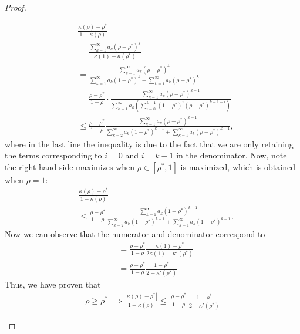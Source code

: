 \documentclass[twoside]{article}
\theoremstyle{definition}
\begin{document}
\begin{proof}
\begin{itemize}
\begin{align*}
&\frac{\kappa(\rho)-\rho^*}{1-\kappa(\rho)} \\
&= \frac{\sum_{k=1}^\infty a_k (\rho-\rho^*)^k}{\kappa(1)- \kappa(\rho^*)}\\
&= \frac{\sum_{k=1}^\infty a_k (\rho-\rho^*)^k}{\sum_{k=1}^\infty a_k (1-\rho^*)^k - \sum_{k=1}^\infty a_k (\rho-\rho^*)^k}  \\
&= \frac{\rho-\rho^*}{1-\rho}\cdot\frac{\sum_{k=1}^\infty a_k (\rho-\rho^*)^{k-1}}{\sum_{k=1}^\infty a_k (\sum_{i=0}^{k-1}(1-\rho^*)^i(\rho-\rho^*)^{k-1-i})}\\
&\le \frac{\rho-\rho^*}{1-\rho}\frac{\sum_{k=1}^\infty a_k (\rho-\rho^*)^{k-1}}{\sum_{k=2}^\infty a_k (1-\rho^*)^{k-1} + \sum_{k=1}^\infty a_k (\rho-\rho^*)^{k-1}},
\end{align*}
where in the last line the inequality is due to the fact that we are only retaining the terms corresponding to $i=0$ and $i=k-1$ in the denominator.
Now, note the right hand side maximizes when $\rho\in[\rho^*,1]$ is maximized, which is obtained when $\rho=1$:
\begin{align*}
&\frac{\kappa(\rho)-\rho^*}{1-\kappa(\rho)}\\
&\le \frac{\rho-\rho^*}{1-\rho}\frac{\sum_{k=1}^\infty a_k (1-\rho^*)^{k-1}}{\sum_{k=2}^\infty a_k (1-\rho^*)^{k-1} + \sum_{k=1}^\infty a_k (1-\rho^*)^{k-1}}.
\end{align*}
Now we can observe that the numerator and denominator correspond to 
\begin{align*}
    &=\frac{\rho-\rho^*}{1-\rho}\frac{\kappa(1)-\rho^*}{2\kappa(1)-\kappa'(\rho^*)}\\
&=\frac{\rho-\rho^*}{1-\rho}\frac{1-\rho^*}{2-\kappa'(\rho^*)}
\end{align*}
Thus, we have proven that 
\begin{align*}
\rho \ge \rho^* \implies \frac{|\kappa(\rho)-\rho^*|}{1-\kappa(\rho)} \le \frac{|\rho-\rho^*|}{1-\rho} \frac{1-\rho^*}{2-\kappa'(\rho^*)}
\end{align*}


\end{itemize}
\end{proof}
\end{document}

